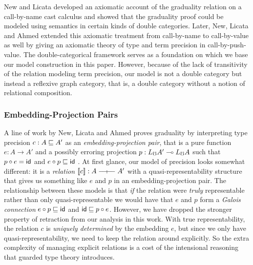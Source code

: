 New and Licata \cite{new-licata18} developed an axiomatic account of the
graduality relation on a call-by-name cast calculus and showed that the
graduality proof could be modeled using semantics in certain kinds of double
categories.
%
Later, New, Licata and Ahmed \cite{new-licata-ahmed2019} extended this axiomatic
treatment from call-by-name to call-by-value as well by giving an axiomatic
theory of type and term precision in call-by-push-value. The double-categorical
framework serves as a foundation on which we base our model construction in this
paper. However, because of the lack of transitivity of the relation modeling
term precision, our model is not a double category but instead a reflexive graph
category, that is, a double category without a notion of relational composition.



\subsubsection{Embedding-Projection Pairs}

A line of work by New, Licata and Ahmed proves graduality by
interpreting type precision $c : A \sqsubseteq A'$ as an
\emph{embedding-projection pair}, that is a pure function $e : A \to
A'$ and a possibly erroring projection $p : L_\mho A' \multimap L_\mho A$
such that $p \circ e = \mathsf{id}$ and $e \circ p \sqsubseteq \mathsf{id}$
\cite{new-ahmed2018,new-licata18,new-licata-ahmed2019}. At first glance, our model
of precision looks somewhat different: it is a \emph{relation}
$\sem{c} : A \rel A'$ with a quasi-representability structure that
gives us something like $e$ and $p$ in an embedding-projection
pair. The relationship between these models is that \emph{if} the
relation were \emph{truly} representable rather than only
quasi-representable we would have that $e$ and $p$ form a \emph{Galois
connection} $e \circ p \sqsubseteq \mathsf{id}$ and $\mathsf{id} \sqsubseteq p \circ
e$. However, we have dropped the stronger property of retraction from
our analysis in this work. With true representability, the relation
$c$ is \emph{uniquely determined} by the embedding $e$, but since we
only have quasi-representability, we need to keep the relation around
explicitly. So the extra complexity of managing explicit relations is
a cost of the intensional reasoning that guarded type theory
introduces.


